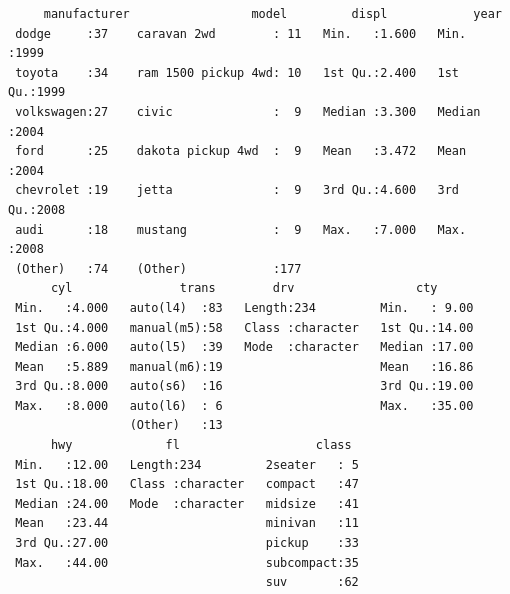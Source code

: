 \documentclass[
  11pt,
]{krantz}
\newenvironment{Shaded}{\begin{snugshade}}{\end{snugshade}}
\newcommand{\CommentTok}[1]{\textcolor[rgb]{0.37,0.37,0.37}{\textit{#1}}}
\newcommand{\KeywordTok}[1]{\textcolor[rgb]{0.27,0.27,0.27}{\textbf{#1}}}
\newcommand{\NormalTok}[1]{#1}
\newcommand{\OperatorTok}[1]{\textcolor[rgb]{0.43,0.43,0.43}{\textbf{#1}}}
\newcommand{\StringTok}[1]{\textcolor[rgb]{0.5,0.5,0.5}{#1}}
\begin{document}
\begin{Shaded}
\end{Shaded}

\begin{verbatim}
     manufacturer                 model         displ            year     
 dodge     :37    caravan 2wd        : 11   Min.   :1.600   Min.   :1999  
 toyota    :34    ram 1500 pickup 4wd: 10   1st Qu.:2.400   1st Qu.:1999  
 volkswagen:27    civic              :  9   Median :3.300   Median :2004  
 ford      :25    dakota pickup 4wd  :  9   Mean   :3.472   Mean   :2004  
 chevrolet :19    jetta              :  9   3rd Qu.:4.600   3rd Qu.:2008  
 audi      :18    mustang            :  9   Max.   :7.000   Max.   :2008  
 (Other)   :74    (Other)            :177                                 
      cyl               trans        drv                 cty       
 Min.   :4.000   auto(l4)  :83   Length:234         Min.   : 9.00  
 1st Qu.:4.000   manual(m5):58   Class :character   1st Qu.:14.00  
 Median :6.000   auto(l5)  :39   Mode  :character   Median :17.00  
 Mean   :5.889   manual(m6):19                      Mean   :16.86  
 3rd Qu.:8.000   auto(s6)  :16                      3rd Qu.:19.00  
 Max.   :8.000   auto(l6)  : 6                      Max.   :35.00  
                 (Other)   :13                                     
      hwy             fl                   class   
 Min.   :12.00   Length:234         2seater   : 5  
 1st Qu.:18.00   Class :character   compact   :47  
 Median :24.00   Mode  :character   midsize   :41  
 Mean   :23.44                      minivan   :11  
 3rd Qu.:27.00                      pickup    :33  
 Max.   :44.00                      subcompact:35  
                                    suv       :62  
\end{verbatim}

\begin{Shaded}
\end{Shaded}
\end{document}
